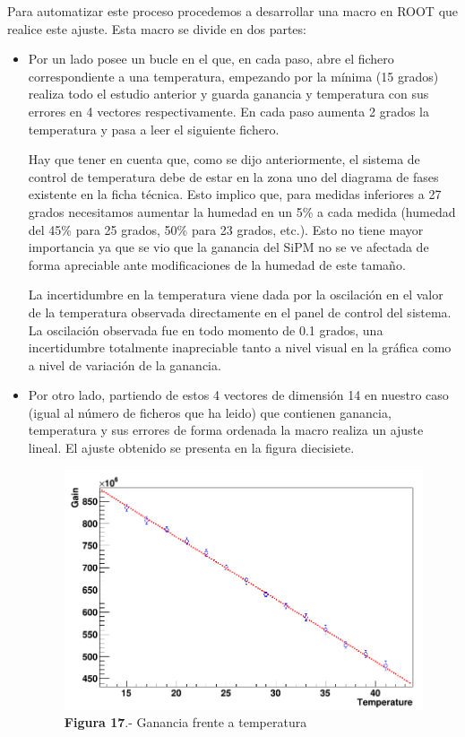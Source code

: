 Para automatizar este proceso procedemos a desarrollar una macro en ROOT que realice este ajuste. Esta macro se divide en dos partes:
\begin{itemize}
\item{} Por un lado posee un bucle en el que, en cada paso, abre el fichero correspondiente a una temperatura, empezando por la mínima (15 grados) realiza todo el estudio anterior y guarda ganancia y temperatura con sus errores en 4 vectores respectivamente. En cada paso aumenta 2 grados la temperatura y pasa a leer el siguiente fichero.

Hay que tener en cuenta que, como se dijo anteriormente, el sistema de control de temperatura debe de estar en la zona uno del diagrama de fases existente en la ficha técnica. Esto implico que, para medidas inferiores a 27 grados necesitamos aumentar la humedad en un 5\% a cada medida (humedad del 45\% para 25 grados, 50\% para 23 grados, etc.). Esto no tiene mayor importancia ya que se vio que la ganancia del SiPM no se ve afectada de forma apreciable ante modificaciones de la humedad de este tamaño.

La incertidumbre en la temperatura viene dada por la oscilación en el valor de la temperatura observada directamente en el panel de control del sistema. La oscilación observada fue en todo momento de 0.1 grados, una incertidumbre totalmente inapreciable tanto a nivel visual en la gráfica como a nivel de variación de la ganancia.

\item {} Por otro lado, partiendo de estos 4 vectores de dimensión 14 en nuestro caso (igual al número de ficheros que ha leido) que contienen ganancia, temperatura y sus errores de forma ordenada la macro realiza un ajuste lineal. El ajuste obtenido se presenta en la figura diecisiete.

\begin{figure}[hbtp]
\centering
\includegraphics[scale=0.4]{Dependenciatemperatura.png}
\caption{\textbf{Figura 17}.- Ganancia frente a temperatura}
\end{figure}


\end{itemize}
